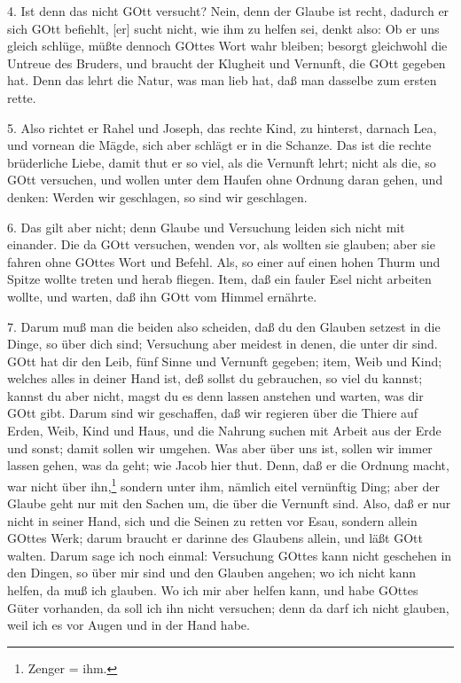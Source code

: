 4. Ist denn das nicht GOtt versucht? Nein, denn der Glaube ist recht, dadurch er sich GOtt befiehlt, [er] sucht nicht, wie ihm zu helfen sei, denkt also: Ob er uns gleich schlüge, müßte dennoch GOttes Wort wahr bleiben; besorgt gleichwohl die Untreue des Bruders, und braucht der Klugheit und Vernunft, die GOtt gegeben hat. Denn das lehrt die Natur, was man lieb hat, daß man dasselbe zum ersten rette.

5. Also richtet er Rahel und Joseph, das rechte Kind, zu hinterst, darnach Lea, und vornean die Mägde, sich aber schlägt er in die Schanze. Das ist die rechte brüderliche Liebe, damit thut er so viel, als die Vernunft lehrt; nicht als die, so GOtt versuchen, und wollen unter dem Haufen ohne Ordnung daran gehen, und denken: Werden wir geschlagen, so sind wir geschlagen.

6. Das gilt aber nicht; denn Glaube und Versuchung leiden sich nicht mit einander. Die da GOtt versuchen, wenden vor, als wollten sie glauben; aber sie fahren ohne GOttes Wort und Befehl. Als, so einer auf einen hohen Thurm und Spitze wollte treten und herab fliegen. Item, daß ein fauler Esel nicht arbeiten wollte, und warten, daß ihn GOtt vom Himmel ernährte.

7. Darum muß man die beiden also scheiden, daß du den Glauben setzest in die Dinge, so über dich sind; Versuchung aber meidest in denen, die unter dir sind. GOtt hat dir den Leib, fünf Sinne und Vernunft gegeben; item, Weib und Kind; welches alles in deiner Hand ist, deß sollst du gebrauchen, so viel du kannst; kannst du aber nicht, magst du es denn lassen anstehen und warten, was dir GOtt gibt. Darum sind wir geschaffen, daß wir regieren über die Thiere auf Erden, Weib, Kind und Haus, und die Nahrung suchen mit Arbeit aus der Erde und sonst; damit sollen wir umgehen. Was aber über uns ist, sollen wir immer lassen gehen, was da geht; wie Jacob hier thut. Denn, daß er die Ordnung macht, war nicht über ihn,\footnote{Zenger = ihm.} sondern unter ihm, nämlich eitel vernünftig Ding; aber der Glaube geht nur mit den Sachen um, die über die Vernunft sind. Also, daß er nur nicht in seiner Hand, sich und die Seinen zu retten vor Esau, sondern allein GOttes Werk; darum braucht er darinne des Glaubens allein, und läßt GOtt walten. Darum sage ich noch einmal: Versuchung GOttes kann nicht geschehen in den Dingen, so über mir sind und den Glauben angehen; wo ich nicht kann helfen, da muß ich glauben. Wo ich mir aber helfen kann, und habe GOttes Güter vorhanden, da soll ich ihn nicht versuchen; denn da darf ich nicht glauben, weil ich es vor Augen und in der Hand habe.

